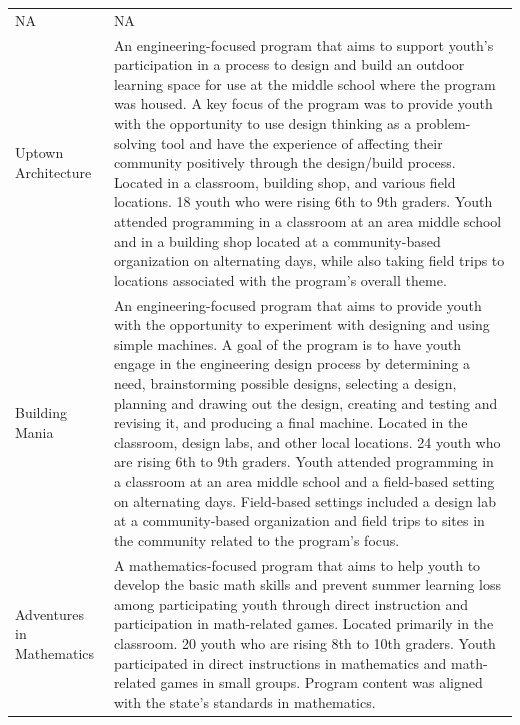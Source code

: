 \documentclass[]{book}
\theoremstyle{definition}
\theoremstyle{definition}
\theoremstyle{definition}
\theoremstyle{remark}
\begin{document}
\begin{tabular}{ll}
NA & NA\\
Uptown Architecture & An engineering-focused program that aims to support youth's participation in a process to design and build an outdoor learning space for use at the middle school where the program was housed. A key focus of the program was to provide youth with the opportunity to use design thinking as a problem-solving tool and have the experience of affecting their community positively through the design/build process. Located in a classroom, building shop, and various field locations. 18 youth who were rising 6th to 9th graders. Youth attended programming in a classroom at an area middle school and in a building shop located at a community-based organization on alternating days, while also taking field trips to locations associated with the program's overall theme.\\
Building Mania & An engineering-focused program that aims to provide youth with the opportunity to experiment with designing and using simple machines. A goal of the program is to have youth engage in the engineering design process by determining a need, brainstorming possible designs, selecting a design, planning and drawing out the design, creating and testing and revising it, and producing a final machine. Located in the classroom, design labs, and other local locations. 24 youth who are rising 6th to 9th graders. Youth attended programming in a classroom at an area middle school and a field-based setting on alternating days. Field-based settings included a design lab at a community-based organization and field trips to sites in the community related to the program's focus.\\
Adventures in Mathematics & A mathematics-focused program that aims to help youth to develop the basic math skills and prevent summer learning loss among participating youth through direct instruction and participation in math-related games. Located primarily in the classroom. 20 youth who are rising 8th to 10th graders. Youth participated in direct instructions in mathematics and math-related games in small groups. Program content was aligned with the state's standards in mathematics.\\
\bottomrule
\end{tabular}
\end{document}
